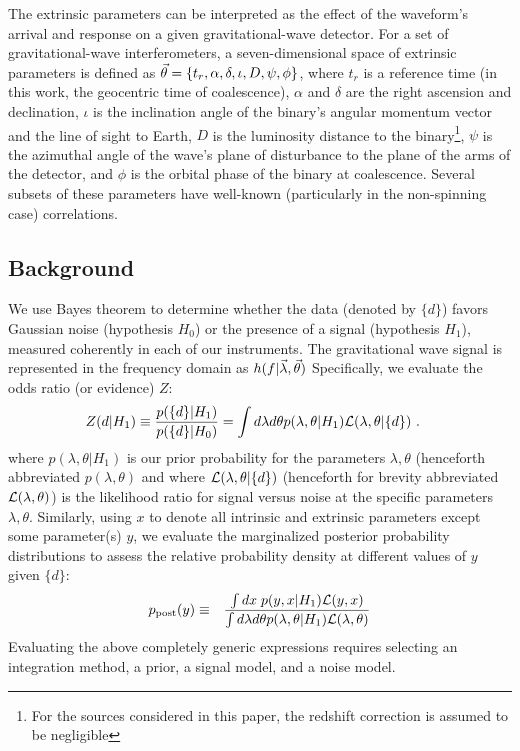The extrinsic parameters can be interpreted as the effect of the waveform's arrival and response on a given gravitational-wave detector. For a set of gravitational-wave interferometers, a seven-dimensional space of extrinsic parameters is defined as $\vec{\theta}=\{t_r,\alpha,\delta,\iota,D,\psi,\phi\}$, where $t_r$ is a reference time (in this work, the geocentric time of coalescence), $\alpha$ and $\delta$ are the right ascension and declination, $\iota$ is the inclination angle of the binary's angular momentum vector and the line of sight to Earth, $D$ is the luminosity distance to the binary\footnote{For the sources considered in this paper, the redshift correction is assumed to be negligible}, $\psi$ is the azimuthal angle of the wave's plane of disturbance to the plane of the arms of the detector, and $\phi$ is the orbital phase of the binary at coalescence. Several subsets of these parameters have well-known (particularly in the non-spinning case) correlations.

\subsection{Background}




We use Bayes theorem to determine whether the data (denoted by $\{d\}$) favors Gaussian noise (hypothesis
$H_0$) or the presence of a signal (hypothesis $H_1$), measured coherently in each of our instruments.  The
gravitational wave signal is represented in the frequency domain as $h(f|\vec{\lambda},\vec{\theta})$  Specifically, we evaluate   the odds ratio (or evidence) $Z$:
\begin{align}
\label{eq:def:Z:Modified}
Z(d|H_1) &\equiv \frac{p(\{d\}|H_1)}{p(\{d\}|H_0)} 
  = \int d\lambda d\theta p(\lambda,\theta|H_1) {\cal L}(\lambda,\theta|\{d\})\ .
\end{align}
where  $p(\lambda,\theta|H_1)$ is our prior probability for the parameters $\lambda,\theta$ (henceforth abbreviated
$p(\lambda,\theta)$ and where ${\cal L}(\lambda,\theta|\{ d\})$ (henceforth for brevity abbreviated ${\cal L}(\lambda,\theta)$) is the likelihood ratio for signal versus noise at the specific parameters
$\lambda,\theta$.  
Similarly, using $x$ to denote all intrinsic and extrinsic parameters except some parameter(s) $y$, we evaluate the marginalized posterior
probability distributions to assess the relative probability density at different values of $y$ given $\{ d\}$:
\begin{eqnarray}
\label{eq:def:Posterior}
p_{\rm post}(y) &\equiv& \frac{\int dx \;  p(y,x|H_1) {\cal L}(y,x)}{ \int d\lambda d\theta p(\lambda,\theta|H_1) {\cal L}(\lambda,\theta)}
\end{eqnarray}
%
Evaluating the above completely generic expressions requires selecting an integration method, a prior,  a signal model, and a
noise model.  



